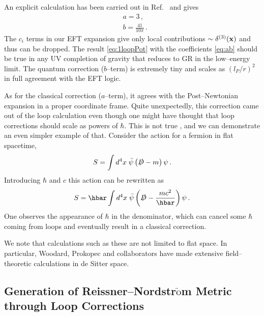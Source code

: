 \documentclass[12pt]{article}
\newcommand{\be}{\begin{equation}}
\newcommand{\ee}{\end{equation}}
\begin{document}
An explicit calculation has been carried out in Ref.~\cite{Donoghue:1994dn} and gives
\be
\label{eq:ab}
 \begin{split}
& a=3\,,\\
& b=\frac{41}{10\pi}\,.
\end{split}
\ee
The $c_i$ terms in our EFT expansion give only local contributions $\sim \delta^{(3)}(\bf{x})$
and thus can be dropped.
The result \eqref{eq:1loopPot} with the coefficients \eqref{eq:ab} should be true in any
UV completion of gravity that reduces to GR in the low--energy limit.
The quantum correction ($b$--term) is extremely tiny and scales as
$\left({l_{P}}/{r} \right)^2$
in full agreement with the EFT logic.

As for the classical correction ($a$--term), it agrees with the Post--Newtonian expansion
in a proper coordinate frame.  Quite unexpectedly, this correction came out of the loop calculation
even though one might have thought that loop corrections should scale as powers of $\hbar$.
This is not true \cite{Holstein}, and we can demonstrate an even simpler example of that. Consider
the action for a fermion in flat spacetime,
\be
S=\int d^4x \; \bar \psi \left(\slashed{D}-m\right)\psi\,.
\ee
Introducing $\hbar$ and $c$ this action can be rewritten as
\be
S=\hbar \int d^4x \; \bar \psi \left(\slashed{D}-\frac{mc^2}{\hbar}\right)\psi\,.
\ee
One observes the appearance of $\hbar$ in the denominator, which can cancel some $\hbar$
coming from loops and eventually result in a classical correction.

We note that calculations such as these are not limited to flat space. In particular, Woodard, Prokopec and
collaborators \cite{Woodard:2014jba, Park:2015kua, Glavan} have made extensive field--theoretic calculations in de Sitter space.


\subsection{Generation of Reissner--Nordstr$\ddot{\text{o}}$m Metric through Loop Corrections}
\end{document}
